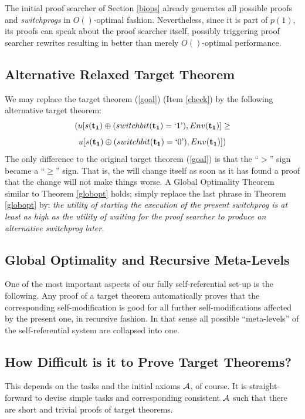 The initial proof searcher of Section \ref{biops}
already generates all possible proofs and {\em switchprogs} in $O()$-optimal fashion. 
Nevertheless, since it is part of $p(1)$, its proofs can speak about the
proof searcher itself, possibly triggering proof searcher rewrites 
resulting in better than merely $O()$-optimal performance.

\subsection{Alternative Relaxed Target Theorem}
\label{alternative}
We may replace the target theorem  (\ref{goal}) (Item \ref{check})
by the following 
alternative target theorem:
\[
(u[s({\bf t_1}) \oplus (switchbit({\bf t_1})=`1\textrm{'}), Env({\bf t_1})] \geq
\]
\begin{equation}
\label{goal2}
u[s({\bf t_1}) \oplus (switchbit({\bf t_1})=`0\textrm{'}), Env({\bf t_1})] )
\end{equation}
The only difference to the original target theorem  (\ref{goal})
is that the ``$>$'' sign became a  ``$\geq$'' sign. That is,
the \gm will change itself as soon as it has found a proof
that the change will not make things worse.
A Global Optimality Theorem similar to Theorem \ref{globopt}
holds; simply replace the last phrase 
in Theorem \ref{globopt} by:
  {\em the utility of starting the execution of the present
  {\em switchprog} is at least as high as the 
  utility of waiting for the proof searcher
  to produce an alternative {\em switchprog} later.}

\subsection{Global Optimality and Recursive Meta-Levels}
\label{comment}
One of the most important
aspects of our fully self-referential set-up is the following.
Any proof of a target theorem automatically proves 
that the corresponding self-modification is good for all
further self-modifications affected by the present one,
in recursive fashion. 
In that sense all possible ``meta-levels'' of the self-referential
system are collapsed into one. 

\subsection{How Difficult is it to Prove Target Theorems?}
\label{difficult}
This depends on the tasks and the initial axioms $\cal A$, of course.
It is straight-forward to devise simple tasks and 
corresponding consistent $\cal A$
such that there are short and trivial proofs of target theorems.

